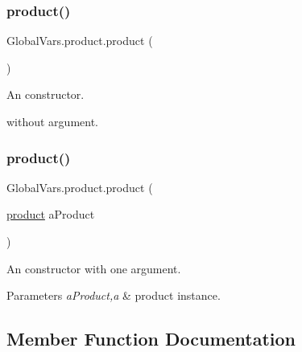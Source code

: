 \subsubsection{\texorpdfstring{product()}{product()}\hspace{0.1cm}{\footnotesize\ttfamily [1/2]}}
{\footnotesize\ttfamily Global\+Vars.\+product.\+product (\begin{DoxyParamCaption}{ }\end{DoxyParamCaption})\hspace{0.3cm}{\ttfamily [inline]}}



An constructor. 

without argument. \mbox{\label{class_global_vars_1_1product_aea0a467580d4e1dbc977f42140334605}} 
\subsubsection{\texorpdfstring{product()}{product()}\hspace{0.1cm}{\footnotesize\ttfamily [2/2]}}
{\footnotesize\ttfamily Global\+Vars.\+product.\+product (\begin{DoxyParamCaption}\item[{\mbox{\hyperlink{class_global_vars_1_1product}{product}}}]{a\+Product }\end{DoxyParamCaption})\hspace{0.3cm}{\ttfamily [inline]}}



An constructor with one argument. 


\begin{DoxyParams}{Parameters}
{\em a\+Product,a} & product instance. \\
\hline
\end{DoxyParams}


\subsection{Member Function Documentation}
\mbox{\label{class_global_vars_1_1product_ad0777eac2225214c7b3abd5f961e41ce}} 
